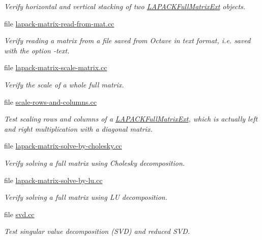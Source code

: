 \begin{DoxyCompactItemize}
\begin{DoxyCompactList}\small\item\em Verify horizontal and vertical stacking of two \hyperlink{classLAPACKFullMatrixExt}{L\+A\+P\+A\+C\+K\+Full\+Matrix\+Ext} objects. \end{DoxyCompactList}\item 
file \hyperlink{lapack-matrix-read-from-mat_8cc}{lapack-\/matrix-\/read-\/from-\/mat.\+cc}
\begin{DoxyCompactList}\small\item\em Verify reading a matrix from a file saved from Octave in text format, i.\+e. saved with the option {\ttfamily -\/text}. \end{DoxyCompactList}\item 
file \hyperlink{lapack-matrix-scale-matrix_8cc}{lapack-\/matrix-\/scale-\/matrix.\+cc}
\begin{DoxyCompactList}\small\item\em Verify the scale of a whole full matrix. \end{DoxyCompactList}\item 
file \hyperlink{scale-rows-and-columns_8cc}{scale-\/rows-\/and-\/columns.\+cc}
\begin{DoxyCompactList}\small\item\em Test scaling rows and columns of a \hyperlink{classLAPACKFullMatrixExt}{L\+A\+P\+A\+C\+K\+Full\+Matrix\+Ext}, which is actually left and right multiplication with a diagonal matrix. \end{DoxyCompactList}\item 
file \hyperlink{lapack-matrix-solve-by-cholesky_8cc}{lapack-\/matrix-\/solve-\/by-\/cholesky.\+cc}
\begin{DoxyCompactList}\small\item\em Verify solving a full matrix using Cholesky decomposition. \end{DoxyCompactList}\item 
file \hyperlink{lapack-matrix-solve-by-lu_8cc}{lapack-\/matrix-\/solve-\/by-\/lu.\+cc}
\begin{DoxyCompactList}\small\item\em Verify solving a full matrix using LU decomposition. \end{DoxyCompactList}\item 
file \hyperlink{svd_8cc}{svd.\+cc}
\begin{DoxyCompactList}\small\item\em Test singular value decomposition (S\+VD) and reduced S\+VD. \end{DoxyCompactList}\item 

\end{DoxyCompactItemize}
